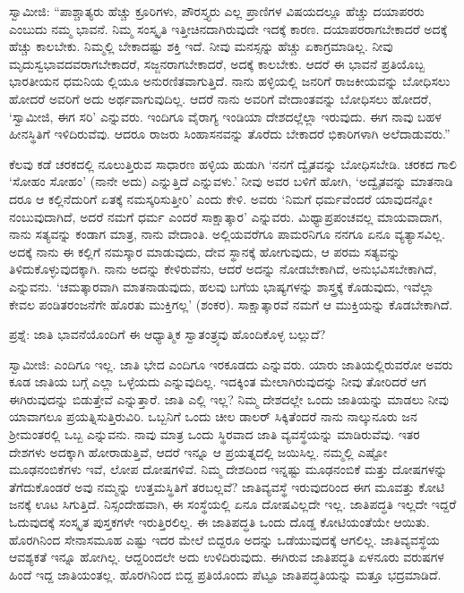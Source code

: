 ಸ್ವಾಮೀಜಿ: “ಪಾಶ್ಚಾತ್ಯರು ಹೆಚ್ಚು ಕ್ರೂರಿಗಳು, ಪೌರಸ್ತ್ಯರು ಎಲ್ಲ ಪ್ರಾಣಿಗಳ ವಿಷಯದಲ್ಲೂ ಹೆಚ್ಚು ದಯಾಪರರು ಎಂಬುದು ನಮ್ಮ ಭಾವನೆ. ನಿಮ್ಮ ಸಂಸ್ಕೃತಿ ಇತ್ತೀಚಿನದಾಗಿರುವುದೇ ಇದಕ್ಕೆ ಕಾರಣ. ದಯಾಪರರಾಗಬೇಕಾದರೆ ಅದಕ್ಕೆ ಹೆಚ್ಚು ಕಾಲಬೇಕು. ನಿಮ್ಮಲ್ಲಿ ಬೇಕಾದಷ್ಟು ಶಕ್ತಿ ಇದೆ. ನೀವು ಮನಸ್ಸನ್ನು ಹೆಚ್ಚು ಏಕಾಗ್ರಮಾಡಿಲ್ಲ. ನೀವು ಮೃದುಸ್ವಭಾವದವರಾಗಬೇಕಾದರೆ, ಸಜ್ಜನರಾಗಬೇಕಾದರೆ, ಅದಕ್ಕೆ ಕಾಲಬೇಕು. ಆದರೆ ಈ ಭಾವನೆ ಪ್ರತಿಯೊಬ್ಬ ಭಾರತೀಯನ ಧಮನಿಯ ಲ್ಲಿಯೂ ಅನುರಣಿತವಾಗುತ್ತಿದೆ. ನಾನು ಹಳ್ಳಿಯಲ್ಲಿ ಜನರಿಗೆ ರಾಜಕೀಯವನ್ನು ಬೋಧಿಸಲು ಹೋದರೆ ಅವರಿಗೆ ಅದು ಅರ್ಥವಾಗುವುದಿಲ್ಲ. ಆದರೆ ನಾನು ಅವರಿಗೆ ವೇದಾಂತವನ್ನು ಬೋಧಿಸಲು ಹೋದರೆ, ‘ಸ್ವಾಮೀಜಿ, ಈಗ ಸರಿ’ ಎನ್ನುವರು. ಇಂದಿಗೂ ವೈರಾಗ್ಯ ಇಂಡಿಯಾ ದೇಶದಲ್ಲೆಲ್ಲಾ ಇರುವುದು. ಈಗ ನಾವು ಬಹಳ ಹೀನಸ್ಥಿತಿಗೆ ಇಳಿದಿರುವೆವು. ಆದರೂ ರಾಜರು ಸಿಂಹಾಸನವನ್ನು ತೊರೆದು ಬೇಕಾದರೆ ಭಿಕಾರಿಗಳಾಗಿ ಅಲೆದಾಡುವರು.”

ಕೆಲವು ಕಡೆ ಚರಕದಲ್ಲಿ ನೂಲುತ್ತಿರುವ ಸಾಧಾರಣ ಹಳ್ಳಿಯ ಹುಡುಗಿ ‘ನನಗೆ ದ್ವೈತವನ್ನು ಬೋಧಿಸಬೇಡಿ. ಚರಕದ ಗಾಲಿ ‘ಸೋಹಂ ಸೋಹಂ’ (ನಾನೇ ಅದು) ಎನ್ನುತ್ತಿದೆ ಎನ್ನುವಳು.’ ನೀವು ಅವರ ಬಳಿಗೆ ಹೋಗಿ, ‘ಅದ್ವೈತವನ್ನು ಮಾತನಾಡಿ ದರೂ ಆ ಕಲ್ಲಿನೆದುರಿಗೆ ಏತಕ್ಕೆ ನಮಸ್ಕರಿಸುತ್ತೀರಿ’ ಎಂದು ಕೇಳಿ. ಅವರು ‘ನಿಮಗೆ ಧರ್ಮವೆಂದರೆ ಯಾವುದನ್ನೋ ನಂಬುವುದಾಗಿದೆ, ಅದರೆ ನಮಗೆ ಧರ್ಮ ಎಂದರೆ ಸಾಕ್ಷಾತ್ಕಾರ’ ಎನ್ನುವರು. ಮಿಥ್ಯಾಪ್ರಪಂಚವಲ್ಲ ಮಾಯವಾದಾಗ, ನಾನು ಸತ್ಯವನ್ನು ಕಂಡಾಗ ಮಾತ್ರ, ನಾನು ವೇದಾಂತಿ. ಅಲ್ಲಿಯವರೆಗೂ ಪಾಮರನಿಗೂ ನನಗೂ ಏನೂ ವ್ಯತ್ಯಾಸವಿಲ್ಲ. ಅದಕ್ಕೆ ನಾನು ಈ ಕಲ್ಲಿಗೆ ನಮಸ್ಕಾರ ಮಾಡುವುದು, ದೇವ ಸ್ಥಾನಕ್ಕೆ ಹೋಗುವುದು, ಆ ಪರಮ ಸತ್ಯವನ್ನು ತಿಳಿದುಕೊಳ್ಳುವುದಕ್ಕಾಗಿ. ನಾನು ಅದನ್ನು ಕೇಳಿರುವೆನು, ಆದರೆ ಅದನ್ನು ನೋಡಬೇಕಾಗಿದೆ, ಅನುಭವಿಸಬೇಕಾಗಿದೆ, ಎನ್ನುವನು. ‘ಚಮತ್ಕಾರವಾಗಿ ಮಾತನಾಡುವುದು, ಹಲವು ಬಗೆಯ ಭಾಷ್ಯಗಳನ್ನು ಶಾಸ್ತ್ರಕ್ಕೆ ಕೊಡುವುದು, ಇವೆಲ್ಲಾ ಕೇವಲ ಪಂಡಿತರಂಜನೆಗೇ ಹೊರತು ಮುಕ್ತಿಗಲ್ಲ’ (ಶಂಕರ). ಸಾಕ್ಷಾತ್ಕಾರವೆ ನಮಗೆ ಆ ಮುಕ್ತಿಯನ್ನು ಕೊಡಬೇಕಾಗಿದೆ.

ಪ್ರಶ್ನೆ: ಜಾತಿ ಭಾವನೆಯೊಂದಿಗೆ ಈ ಆಧ್ಯಾತ್ಮಿಕ ಸ್ವಾತಂತ್ರ್ಯವು ಹೊಂದಿಕೊಳ್ಳ ಬಲ್ಲುದೆ?

ಸ್ವಾಮೀಜಿ: ಎಂದಿಗೂ ಇಲ್ಲ. ಜಾತಿ ಭೇದ ಎಂದಿಗೂ ಇರಕೂಡದು ಎನ್ನುವರು. ಯಾರು ಜಾತಿಯಲ್ಲಿರುವರೋ ಅವರು ಕೂಡ ಜಾತಿಯ ಬಗ್ಗೆ ಎಲ್ಲಾ ಒಳ್ಳೆಯದು ಎನ್ನುವುದಿಲ್ಲ. ಇದಕ್ಕಿಂತ ಮೇಲಾಗಿರುವುದನ್ನು ನೀವು ತೋರಿದರೆ ಆಗ ಈಗಿರುವುದನ್ನು ಬಿಡುತ್ತೇವೆ ಎನ್ನುತ್ತಾರೆ. ಜಾತಿ ಎಲ್ಲಿ ಇಲ್ಲ? ನಿಮ್ಮ ದೇಶದಲ್ಲೇ ಒಂದು ಜಾತಿಯನ್ನು ಮಾಡಲು ನೀವು ಯಾವಾಗಲೂ ಪ್ರಯತ್ನಿಸುತ್ತಿರುವಿರಿ. ಒಬ್ಬನಿಗೆ ಒಂದು ಚೀಲ ಡಾಲರ್​ ಸಿಕ್ಕಿತೆಂದರೆ ನಾನು ನಾಲ್ಕುನೂರು ಜನ ಶ‍್ರೀಮಂತರಲ್ಲಿ ಒಬ್ಬ ಎನ್ನುವನು. ನಾವು ಮಾತ್ರ ಒಂದು ಸ್ಥಿರವಾದ ಜಾತಿ ವ್ಯವಸ್ಥೆಯನ್ನು ಮಾಡಿರುವೆವು. ಇತರ ದೇಶಗಳು ಅದಕ್ಕಾಗಿ ಹೋರಾಡುತ್ತಿವೆ, ಆದರೆ ಇನ್ನೂ ಆ ಪ್ರಯತ್ನದಲ್ಲಿ ಜಯಿಸಿಲ್ಲ. ನಮ್ಮಲ್ಲಿ ಎಷ್ಟೋ ಮೂಢನಂಬಿಕೆಗಳು ಇವೆ, ಲೋಪ ದೋಷಗಳಿವೆ. ನಿಮ್ಮ ದೇಶದಿಂದ ಇನ್ನಷ್ಟು ಮೂಢನಂಬಿಕೆ ಮತ್ತು ದೋಷಗಳನ್ನು ತೆಗೆದುಕೊಂಡರೆ ಅವು ನಮ್ಮನ್ನು ಉತ್ತಮಸ್ಥಿತಿಗೆ ತರಬಲ್ಲವೆ? ಜಾತಿವ್ಯವಸ್ಥೆ ಇರುವುದರಿಂದ ಈಗ ಮೂವತ್ತು ಕೋಟಿ ಜನಕ್ಕೆ ಊಟ ಸಿಗುತ್ತಿದೆ. ನಿಸ್ಸಂದೇಹವಾಗಿ, ಈ ಸಂಸ್ಥೆಯಲ್ಲಿ ಏನೂ ದೋಷವಿಲ್ಲದೇ ಇಲ್ಲ. ಜಾತಿಪದ್ಧತಿ ಇಲ್ಲದೇ ಇದ್ದರೆ ಓದುವುದಕ್ಕೆ ಸಂಸ್ಕೃತ ಪುಸ್ತಕಗಳೇ ಇರುತ್ತಿರಲಿಲ್ಲ. ಈ ಜಾತಿಪದ್ಧತಿ ಒಂದು ದೊಡ್ಡ ಕೋಟಿಯಂತೆಯೇ ಆಯಿತು. ಹೊರಗಿನಿಂದ ಸೇನಾಸಮೂಹ ಎಷ್ಟು ಇದರ ಮೇಲೆ ಬಿದ್ದರೂ ಅದನ್ನು ಒಡೆಯುವುದಕ್ಕೆ ಆಗಲಿಲ್ಲ. ಜಾತಿವ್ಯವಸ್ಥೆಯ ಆವಶ್ಯಕತೆ ಇನ್ನೂ ಹೋಗಿಲ್ಲ. ಆದ್ದರಿಂದಲೇ ಅದು ಉಳಿದಿರುವುದು. ಈಗಿರುವ ಜಾತಿಪದ್ಧತಿ ಏಳನೂರು ವರುಷಗಳ ಹಿಂದೆ ಇದ್ದ ಜಾತಿಯಂತಲ್ಲ. ಹೊರಗಿನಿಂದ ಬಿದ್ದ ಪ್ರತಿಯೊಂದು ಪೆಟ್ಟೂ ಜಾತಿಪದ್ಧತಿಯನ್ನು ಮತ್ತೂ ಭದ್ರಮಾಡಿದೆ.


